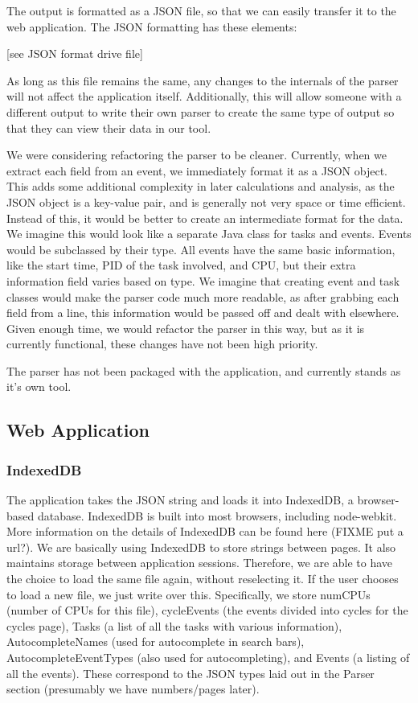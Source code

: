 \documentclass{hmcclinic}
\begin{document}
  The output is formatted as a JSON file, so that we can easily transfer it to
  the web application. The JSON formatting has these elements:

  [see JSON format drive file]

  As long as this file remains the same, any changes to the internals of the
  parser will not affect the application itself. Additionally, this will allow
  someone with a different output to write their own parser to create the same
  type of output so that they can view their data in our tool.

  We were considering refactoring the parser to be cleaner. Currently, when we
  extract each field from an event, we immediately format it as a JSON object.
  This adds some additional complexity in later calculations and analysis, as
  the JSON object is a key-value pair, and is generally not very space or time
  efficient. Instead of this, it would be better to create an intermediate
  format for the data. We imagine this would look like a separate Java class for
  tasks and events. Events would be subclassed by their type. All events have
  the same basic information, like the start time, PID of the task involved, and
  CPU, but their extra information field varies based on type. We imagine that
  creating event and task classes would make the parser code much more readable,
  as after grabbing each field from a line, this information would be passed off
  and dealt with elsewhere. Given enough time, we would refactor the parser in
  this way, but as it is currently functional, these changes have not been high
  priority.

  The parser has not been packaged with the application, and currently stands as
  it's own tool.

  \subsection{Web Application}

  \subsubsection{IndexedDB}

  The application takes the JSON string and loads it into IndexedDB, a
  browser-based database. IndexedDB is built into most browsers, including
  node-webkit. More information on the details of IndexedDB can be found here
  (FIXME put a url?). We are basically using IndexedDB to store strings between
  pages. It also maintains storage between application sessions. Therefore, we
  are able to have the choice to load the same file again, without reselecting
  it. If the user chooses to load a new file, we just write over this.
  Specifically, we store numCPUs (number of CPUs for this file), cycleEvents
  (the events divided into cycles for the cycles page), Tasks (a list of all the
  tasks with various information), AutocompleteNames (used for autocomplete in
  search bars), AutocompleteEventTypes (also used for autocompleting), and
  Events (a listing of all the events). These correspond to the JSON types laid
  out in the Parser section (presumably we have numbers/pages later).
\end{document}
